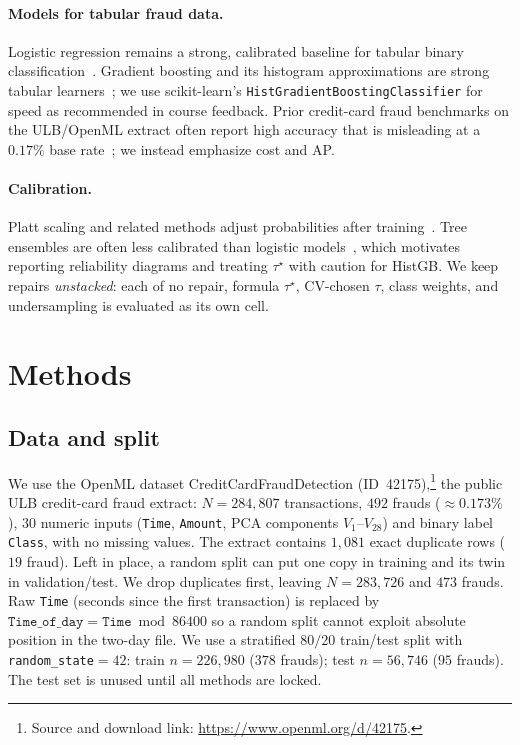 \documentclass[10pt,twocolumn,letterpaper]{article}
\begin{document}
\paragraph{Models for tabular fraud data.}
Logistic regression remains a strong, calibrated baseline for tabular binary classification~\cite{hosmer2013applied}.
Gradient boosting and its histogram approximations are strong tabular learners~\cite{friedman2001greedy,ke2017lightgbm}; we use scikit-learn's \texttt{HistGradientBoostingClassifier} for speed as recommended in course feedback.
Prior credit-card fraud benchmarks on the ULB/OpenML extract often report high accuracy that is misleading at a $0.17\%$ base rate~\cite{dal2015credit}; we instead emphasize cost and AP.

\paragraph{Calibration.}
Platt scaling and related methods adjust probabilities after training~\cite{platt1999probabilistic,niculescu2005predicting}.
Tree ensembles are often less calibrated than logistic models~\cite{niculescu2005predicting}, which motivates reporting reliability diagrams and treating $\tau^{\star}$ with caution for HistGB.
We keep repairs \emph{unstacked}: each of no repair, formula $\tau^{\star}$, CV-chosen $\tau$, class weights, and undersampling is evaluated as its own cell.

\section{Methods}
\subsection{Data and split}
We use the OpenML dataset CreditCardFraudDetection (ID~42175),\footnote{Source and download link: \url{https://www.openml.org/d/42175}.} the public ULB credit-card fraud extract: $N{=}284{,}807$ transactions, $492$ frauds ($\approx 0.173\%$), $30$ numeric inputs (\texttt{Time}, \texttt{Amount}, PCA components $V_1$--$V_{28}$) and binary label \texttt{Class}, with no missing values.
The extract contains $1{,}081$ exact duplicate rows ($19$ fraud).
Left in place, a random split can put one copy in training and its twin in validation/test.
We drop duplicates first, leaving $N{=}283{,}726$ and $473$ frauds.
Raw \texttt{Time} (seconds since the first transaction) is replaced by $\texttt{Time\_of\_day}=\texttt{Time}\bmod 86400$ so a random split cannot exploit absolute position in the two-day file.
We use a stratified $80/20$ train/test split with \texttt{random\_state}${}=42$: train $n{=}226{,}980$ ($378$ frauds); test $n{=}56{,}746$ ($95$ frauds).
The test set is unused until all methods are locked.
\end{document}
